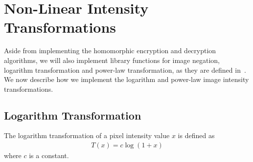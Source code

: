 
\section{Non-Linear Intensity Transformations}
Aside from implementing the homomorphic encryption and decryption algorithms, we will also implement library functions for image negation, logarithm transformation and power-law transformation, as they are defined in~\cite{gonzalez_digital_2008}. We now describe how we implement the logarithm and power-law image intensity transformations.

\subsection{Logarithm Transformation}
The logarithm transformation of a pixel intensity value $x$ is defined as
\begin{align}
	T\left(x\right) = c \log\left(1 + x\right)
\end{align}
where $c$ is a constant.

